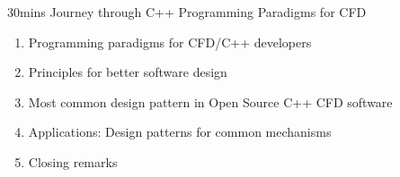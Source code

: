 \begin{frame}[fragile]{30mins Journey through C++ Programming Paradigms for CFD}

    \begin{enumerate}
        \item Programming paradigms for CFD/C++ developers
        \item Principles for better software design
        \item Most common design pattern in Open Source C++ CFD software
        \item Applications: Design patterns for common mechanisms
        \item Closing remarks
    \end{enumerate}

\end{frame}

